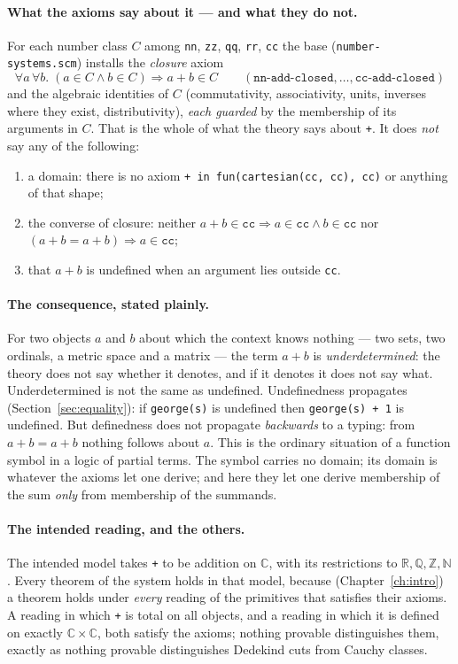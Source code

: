 \paragraph{What the axioms say about it --- and what they do not.}
For each number class $C$ among \texttt{nn}, \texttt{zz}, \texttt{qq},
\texttt{rr}, \texttt{cc} the base (\texttt{number-systems.scm}) installs the
\emph{closure} axiom
\[
  \forall a\,\forall b.\; (a \in C \land b \in C) \Rightarrow a + b \in C
  \qquad (\texttt{nn-add-closed}, \ldots, \texttt{cc-add-closed})
\]
and the algebraic identities of $C$ (commutativity, associativity, units,
inverses where they exist, distributivity), \emph{each guarded} by the
membership of its arguments in $C$.  That is the whole of what the theory
says about \texttt{+}.  It does \emph{not} say any of the following:
\begin{enumerate}
\item a domain: there is no axiom
  \texttt{+ in fun(cartesian(cc, cc), cc)} or anything of that shape;
\item the converse of closure: neither
  $a + b \in \mathtt{cc} \Rightarrow a \in \mathtt{cc} \land b \in \mathtt{cc}$
  nor $(a + b = a + b) \Rightarrow a \in \mathtt{cc}$;
\item that $a + b$ is undefined when an argument lies outside \texttt{cc}.
\end{enumerate}

\paragraph{The consequence, stated plainly.}
For two objects $a$ and $b$ about which the context knows nothing --- two
sets, two ordinals, a metric space and a matrix --- the term $a + b$ is
\emph{underdetermined}: the theory does not say whether it denotes, and if it
denotes it does not say what.  Underdetermined is not the same as undefined.
Undefinedness propagates (Section~\ref{sec:equality}): if \texttt{george(s)}
is undefined then \texttt{george(s) + 1} is undefined.  But definedness does
not propagate \emph{backwards} to a typing: from $a + b = a + b$ nothing
follows about $a$.  This is the ordinary situation of a function symbol in a
logic of partial terms.  The symbol carries no domain; its domain is whatever
the axioms let one derive; and here they let one derive membership of the
sum \emph{only} from membership of the summands.

\paragraph{The intended reading, and the others.}
The intended model takes \texttt{+} to be addition on $\mathbb{C}$, with its
restrictions to $\mathbb{R}, \mathbb{Q}, \mathbb{Z}, \mathbb{N}$.  Every
theorem of the system holds in that model, because (Chapter~\ref{ch:intro})
a theorem holds under \emph{every} reading of the primitives that satisfies
their axioms.  A reading in which \texttt{+} is total on all objects, and a
reading in which it is defined on exactly $\mathbb{C} \times \mathbb{C}$,
both satisfy the axioms; nothing provable distinguishes them, exactly as
nothing provable distinguishes Dedekind cuts from Cauchy classes.

